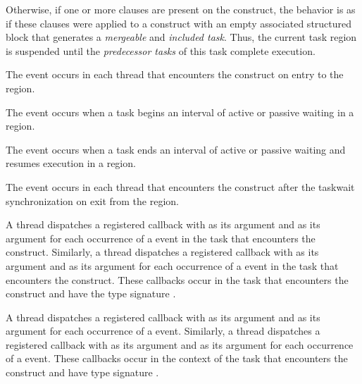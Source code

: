 Otherwise, if one or more  clauses are present on the
 construct, the behavior is as if these clauses were applied to
a  construct with an empty associated structured block that
generates a \emph{mergeable} and \emph{included task}. Thus, the current task region 
is suspended until the \emph{predecessor tasks} of this task complete execution.

\events

The  event occurs in each thread that encounters the
 construct on entry to the  region.

The  event occurs when a task begins an interval 
of active or passive waiting in a  region.

The  event occurs when a task ends an interval of 
active or passive waiting and resumes execution in a  region.

The  event occurs in each thread that encounters the
 construct after the taskwait synchronization on exit 
from the  region.

\tools

A thread dispatches a registered 
callback with  as its  argument
and  as its  argument for each
occurrence of a  event in the task that encounters
the  construct. Similarly, a thread dispatches a registered
 callback with 
as its  argument and  as its 
argument for each  occurrence of a  event in the task that
encounters the  construct. These callbacks occur in the task that
encounters the  construct and have the type signature
.

A thread dispatches a registered  callback
with  as its  argument and
 as its  argument for each occurrence of
a  event. Similarly, a thread dispatches a registered
 callback with 
as its  argument and  as its  argument
for each occurrence of a  event. These callbacks occur in the
context of the task that encounters the  construct and have type 
signature .

